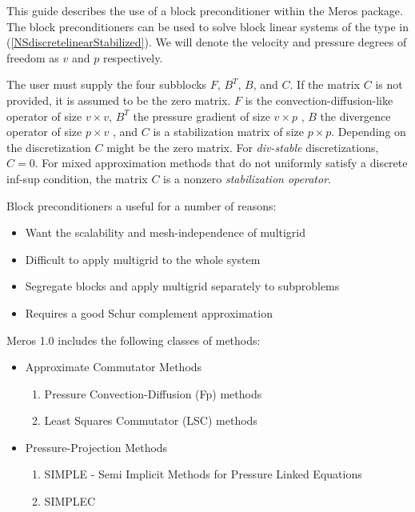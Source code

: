 This guide describes the use of a block preconditioner within the
Meros package.  The block preconditioners can be used to solve block
linear systems of the type in (\ref{NSdiscretelinearStabilized}).
We will denote the velocity
and pressure degrees of freedom as $v$ and $p$ respectively.

The user must supply the four subblocks $F$, $B^T$, $B$, and $C$. If
the matrix $C$ is not provided, it is assumed to be the zero matrix.
$F$ is the convection-diffusion-like operator of size $v \times v$,
$B^T$ the pressure gradient of size $v \times p$ , $B$ the divergence
operator of size $p \times v$ , and $C$ is a stabilization matrix of
size $p \times p$.  Depending on the discretization $C$ might be the
zero matrix. For {\em div-stable} discretizations, $C=0$.  For mixed
approximation methods that do not uniformly satisfy a discrete inf-sup
condition, the matrix $C$ is a nonzero {\em stabilization operator}.

Block preconditioners a useful for a number of reasons:


\begin{itemize}
\item Want the scalability and mesh-independence of multigrid 
\item Difficult to apply multigrid to the whole system 
\item Segregate blocks and apply multigrid separately to subproblems 
\item Requires a good Schur complement approximation 
\end{itemize}



Meros 1.0 includes the following classes of methods:

\begin{itemize}
\item Approximate Commutator Methods
\begin{enumerate}
 \item Pressure Convection-Diffusion (Fp) methods 
 \item Least Squares Commutator (LSC) methods 
\end{enumerate}
\item Pressure-Projection Methods
\begin{enumerate}
 \item SIMPLE - Semi Implicit Methods for Pressure Linked Equations 
 \item SIMPLEC 
\end{enumerate}
\end{itemize}














